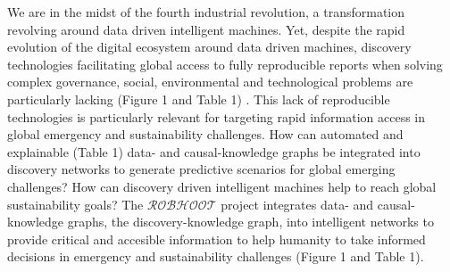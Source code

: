 \documentclass[11pt, a4paper]{article} %
\begin{document}

We are in the midst of the fourth industrial revolution, a
transformation revolving around data driven intelligent machines. Yet,
despite the rapid evolution of the digital ecosystem around data
driven machines, discovery technologies facilitating global access to
fully reproducible reports when solving complex governance, social,
environmental and technological problems are particularly lacking
(Figure 1 and Table 1) \citep{Mastrangelo2019}. This lack of
reproducible technologies is particularly relevant for targeting rapid
information access in global emergency and sustainability
challenges. How can automated and explainable (Table 1) data- and
causal-knowledge graphs be integrated into discovery networks to
generate predictive scenarios for global emerging challenges? How can
discovery driven intelligent machines help to reach global
sustainability goals? The $\mathcal{ROBHOOT}$ project integrates data-
and causal-knowledge graphs, the discovery-knowledge graph, into
intelligent networks to provide critical and accesible information to
help humanity to take informed decisions in emergency and
sustainability challenges (Figure 1 and Table 1).
\end{document}
